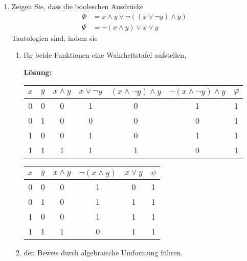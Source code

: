 \documentclass[paper=a4,fontsize=11pt]{scrartcl}%
\numberwithin{equation}{section}
\newenvironment{solution}
	{
		\color{Blue}
		\textbf{Lösung:}
	}{}
\begin{document}
\begin{enumerate}
\begin{enumerate}
		\begin{solution}
		
		\begin{align*}
		(1) (M \cup \overline{N}) \cap N = M \cap N\\
		(2) (M \cap \overline{N} \cup N = M \cup N
		\end{align*}
		\end{solution}
		\end{enumerate}
	\item Zeigen Sie, dass die booleschen Ausdrücke
	\begin{align*}
		\Phi &= x \land y  \lor \neg ((x \lor \neg y) \land y)\\
		\Psi &= \neg (x \land y) \lor x \lor y
	\end{align*}
	Tautologien sind, indem sie
	\begin{enumerate}
		\item für beide Funktionen eine Wahrheitstafel aufstellen,
		
		\begin{solution}
		\begin{table}[ht]
	\centering
\begin{tabular}{|c|c|c|c|c|c|c|}
\hline
 $x$ & $y$ & $x \land y$ & $x \lor \neg y$ & $(x \land \neg y) \land y$ & $\neg (x \land \neg y) \land y$ & $\varphi$ \\ \hline
0 & 0 & 0 & 1 & 0 & 1 & 1 \\ \hline
0 & 1 & 0 & 0 & 0 & 0 & 1 \\ \hline
1 & 0 & 0 & 1 & 0 & 1 & 1 \\ \hline
1 & 1 & 1 & 1 & 1 & 0 & 1 \\ \hline
\end{tabular}
\end{table}
\begin{table}[ht]
	\centering
\begin{tabular}{|c|c|c|c|c|c|}
\hline
 $x$ & $y$ & $x \land y$ & $\neg(x \land y)$ & $x \lor y$ & $\psi$ \\ \hline
0 & 0 & 0 & 1 & 0 & 1  \\ \hline
0 & 1 & 0 & 1 & 1 & 1 \\ \hline
1 & 0 & 0 & 1 & 1 & 1 \\ \hline
1 & 1 & 1 & 0 & 1 & 1 \\ \hline
\end{tabular}
\end{table}
\end{solution}
		\item den Beweis durch algebraische Umformung führen.
		

\end{enumerate}
\end{enumerate}
\end{document}
